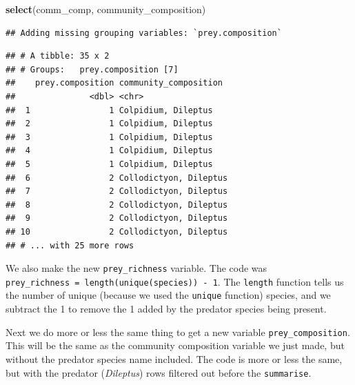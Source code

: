 \documentclass[]{book}
\newenvironment{Shaded}{\begin{snugshade}}{\end{snugshade}}
\newcommand{\DataTypeTok}[1]{\textcolor[rgb]{0.13,0.29,0.53}{#1}}
\newcommand{\KeywordTok}[1]{\textcolor[rgb]{0.13,0.29,0.53}{\textbf{#1}}}
\newcommand{\NormalTok}[1]{#1}
\newcommand{\OperatorTok}[1]{\textcolor[rgb]{0.81,0.36,0.00}{\textbf{#1}}}
\newcommand{\StringTok}[1]{\textcolor[rgb]{0.31,0.60,0.02}{#1}}
\begin{document}
\begin{Shaded}
\begin{Highlighting}[]
\KeywordTok{select}\NormalTok{(comm_comp, community_composition)}
\end{Highlighting}
\end{Shaded}

\begin{verbatim}
## Adding missing grouping variables: `prey.composition`
\end{verbatim}

\begin{verbatim}
## # A tibble: 35 x 2
## # Groups:   prey.composition [7]
##    prey.composition community_composition 
##               <dbl> <chr>                 
##  1                1 Colpidium, Dileptus   
##  2                1 Colpidium, Dileptus   
##  3                1 Colpidium, Dileptus   
##  4                1 Colpidium, Dileptus   
##  5                1 Colpidium, Dileptus   
##  6                2 Collodictyon, Dileptus
##  7                2 Collodictyon, Dileptus
##  8                2 Collodictyon, Dileptus
##  9                2 Collodictyon, Dileptus
## 10                2 Collodictyon, Dileptus
## # ... with 25 more rows
\end{verbatim}

We also make the new \texttt{prey\_richness} variable. The code was \texttt{prey\_richness\ =\ length(unique(species))\ -\ 1}. The \texttt{length} function tells us the number of unique (because we used the \texttt{unique} function) species, and we subtract the 1 to remove the 1 added by the predator species being present.

Next we do more or less the same thing to get a new variable \texttt{prey\_composition}. This will be the same as the community composition variable we just made, but without the predator species name included. The code is more or less the same, but with the predator (\emph{Dileptus}) rows filtered out before the \texttt{summarise}.

\begin{Shaded}
\end{Shaded}
\end{document}
